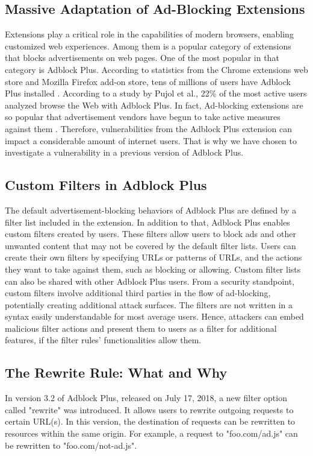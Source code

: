\documentclass[conference]{IEEEtran}
\begin{document}
\subsection{Massive Adaptation of Ad-Blocking Extensions}
Extensions play a critical role in the capabilities of modern browsers, enabling customized web experiences. Among them is a popular category of extensions that blocks advertisements on web pages. One of the most popular in that category is Adblock Plus. According to statistics from the Chrome extensions web store and Mozilla Firefox add-on store, tens of millions of users have Adblock Plus installed \cite{noauthor_adblockchrome_nodate, noauthor_adblockfirefox_nodate}. According to a study by Pujol et al., 22\% of the most active users analyzed browse the Web with Adblock Plus. In fact, Ad-blocking extensions are so popular that advertisement vendors have begun to take active measures against them \cite{mughees_first_2016}. Therefore, vulnerabilities from the Adblock Plus extension can impact a considerable amount of internet users. That is why we have chosen to investigate a vulnerability in a previous version of Adblock Plus.

\subsection{Custom Filters in Adblock Plus}
The default advertisement-blocking behaviors of Adblock Plus are defined by a filter list included in the extension. In addition to that, Adblock Plus enables custom filters created by users. These filters allow users to block ads and other unwanted content that may not be covered by the default filter lists. Users can create their own filters by specifying URLs or patterns of URLs, and the actions they want to take against them, such as blocking or allowing. Custom filter lists can also be shared with other Adblock Plus users. From a security standpoint, custom filters involve additional third parties in the flow of ad-blocking, potentially creating additional attack surfaces. The filters are not written in a syntax easily understandable for most average users. Hence, attackers can embed malicious filter actions and present them to users as a filter for additional features, if the filter rules' functionalities allow them.

\subsection{The Rewrite Rule: What and Why}
In version 3.2 of Adblock Plus, released on July 17, 2018, a new filter option called "rewrite" was introduced. It allows users to rewrite outgoing requests to certain URL(s). In this version, the destination of requests can be rewritten to resources within the same origin. For example, a request to "foo.com/ad.js" can be rewritten to "foo.com/not-ad.js".
\end{document}
